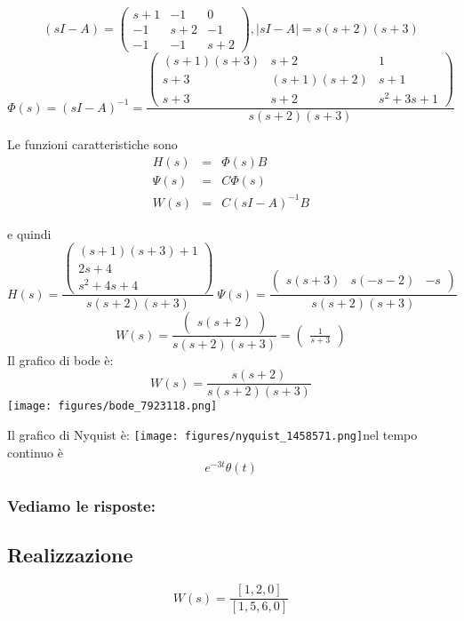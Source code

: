 \documentclass{article}
\begin{document}
\[ (sI-A) = \left(\begin{matrix}s + 1 & -1 & 0\\-1 & s + 2 & -1\\-1 & -1 & s + 2\end{matrix}\right), |sI-A| = s \left(s + 2\right) \left(s + 3\right) \]
\[ \Phi(s) = (sI-A)^{-1} = \frac{\left(\begin{matrix}\left(s + 1\right) \left(s + 3\right) & s + 2 & 1\\s + 3 & \left(s + 1\right) \left(s + 2\right) & s + 1\\s + 3 & s + 2 & s^{2} + 3 s + 1\end{matrix}\right)}{s \left(s + 2\right) \left(s + 3\right)} \]

Le funzioni caratteristiche sono \[\begin{array}{rcl}  H(s) & = & \Phi(s)B \\ \Psi(s) & = & C \Phi(s)\\ W(s) & = & C(sI-A)^{-1}B  \end{array} \]

e quindi \[ H(s)  =  \frac{\left(\begin{matrix}\left(s + 1\right) \left(s + 3\right) + 1\\2 s + 4\\s^{2} + 4 s + 4\end{matrix}\right)}{s \left(s + 2\right) \left(s + 3\right)} \ \Psi(s) = \frac{\left(\begin{matrix}s \left(s + 3\right) & s \left(- s - 2\right) & - s\end{matrix}\right)}{s \left(s + 2\right) \left(s + 3\right)} \]
\[ W(s)  =  \frac{\left(\begin{matrix}s \left(s + 2\right)\end{matrix}\right)}{s \left(s + 2\right) \left(s + 3\right)} = \left(\begin{matrix}\frac{1}{s + 3}\end{matrix}\right)  \] 
Il grafico di bode è:
\[ W(s) = \frac{s \left(s + 2\right)}{s \left(s + 2\right) \left(s + 3\right)} \]\texttt{[image: figures/bode\_7923118.png]}


Il grafico di Nyquist è:
\texttt{[image: figures/nyquist\_1458571.png]}nel tempo continuo è \[ e^{- 3 t} \theta\left(t\right) \]
\subsubsection{Vediamo le risposte:}
\subsection{Realizzazione}
\[ W(s) = \frac{[1, 2, 0]}{[1, 5, 6, 0]} \]
\end{document}
